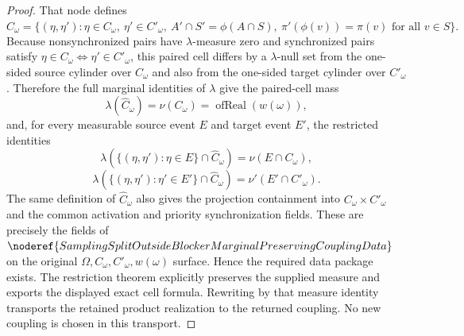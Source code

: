 \begin{proof}
That node defines
\[
  \widehat C_\omega
  =\{(\eta,\eta'):\eta\in C_\omega,\ \eta'\in C'_\omega,\
       A'\cap S'=\phi(A\cap S),\
       \pi'(\phi(v))=\pi(v)\text{ for all }v\in S\}.
\]
Because nonsynchronized pairs have \(\lambda\)-measure zero and synchronized
pairs satisfy
\(\eta\in C_\omega\Longleftrightarrow\eta'\in C'_\omega\), this paired cell
differs by a \(\lambda\)-null set from the one-sided source cylinder over
\(C_\omega\) and also from the one-sided target cylinder over
\(C'_\omega\).  Therefore the full marginal identities of \(\lambda\) give
the paired-cell mass
\[
  \lambda(\widehat C_\omega)=\nu(C_\omega)
  =\operatorname{ofReal}(w(\omega)),
\]
and, for every measurable source event \(E\) and target event \(E'\), the
restricted identities
\[
  \lambda(\{(\eta,\eta'):\eta\in E\}\cap\widehat C_\omega)
    =\nu(E\cap C_\omega),
\]
\[
  \lambda(\{(\eta,\eta'):\eta'\in E'\}\cap\widehat C_\omega)
    =\nu'(E'\cap C'_\omega).
\]
The same definition of \(\widehat C_\omega\) also gives the projection
containment into \(C_\omega\times C'_\omega\) and the common activation and
priority synchronization fields.  These are precisely the fields of
\(\noderef{SamplingSplitOutsideBlockerMarginalPreservingCouplingData}\) on
the original \(\Omega,C_\omega,C'_\omega,w(\omega)\) surface.  Hence the
required data package exists. The restriction theorem explicitly preserves
the supplied measure and exports the displayed exact cell formula. Rewriting
by that measure identity transports the retained product realization to the
returned coupling. No new coupling is chosen in this transport.
\end{proof}
